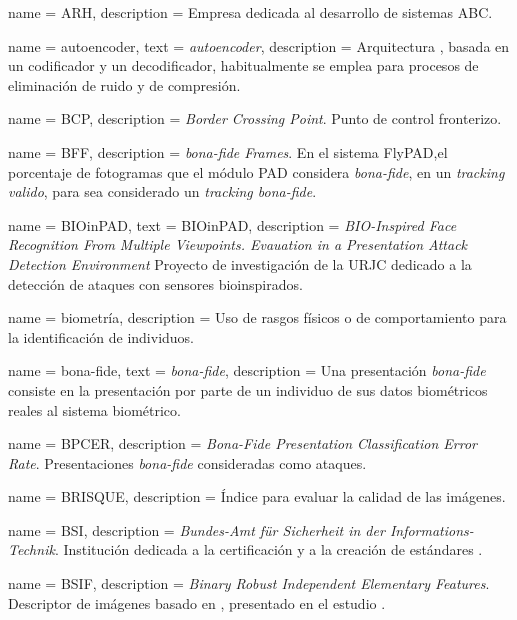 {
    name        = {ARH},
    description = {Empresa dedicada al desarrollo de sistemas ABC.}
}

{
    name        = {autoencoder},
    text        = {\textit{autoencoder}},
    description = {Arquitectura , basada en un codificador y un decodificador, habitualmente se emplea para procesos de eliminación de ruido y de compresión.}
}

{
    name        = {BCP},
    description = {\textit{Border Crossing Point}. Punto de control fronterizo.}
}

{
    name        = BFF,
    description = {\textit{\Gls{bona-fide} Frames}. En el sistema \gls{FlyPAD},el porcentaje de fotogramas que el módulo \gls{PAD} considera \textit{bona-fide}, en un \textit{tracking valido}, para sea considerado un \textit{tracking bona-fide}.}
}

{
    name        = BIOinPAD,
    text        = \mbox{BIOinPAD},
    description = {\textit{BIO-Inspired Face Recognition From Multiple Viewpoints. Evauation in a Presentation Attack Detection Environment} Proyecto de investigación de la URJC dedicado a la detección de ataques con sensores bioinspirados.}
}

{
    name        = biometría,
    description = {Uso de rasgos físicos o de comportamiento para la identificación de individuos.}
}

{
    name        = bona-fide,
    text        = {\mbox{\textit{bona-fide}}},
    description = {Una presentación \textit{bona-fide} consiste en la presentación por parte de un individuo de sus datos biométricos reales al sistema biométrico.}
}

{
    name        = BPCER,
    description = {\textit{Bona-Fide Presentation Classification Error Rate}. Presentaciones \textit{bona-fide} consideradas como ataques.}
}

{
    name        = BRISQUE,
    description = {Índice para evaluar la calidad de las imágenes.}
}

{
    name        = BSI,
    description = {\textit{Bundes-Amt für Sicherheit in der Informations-Technik}. Institución dedicada a la certificación y a la creación de estándares \cite{BSIOnline}.}
}

{
    name        = BSIF,
    description = {\textit{Binary Robust Independent Elementary Features}. Descriptor de imágenes basado en , presentado en el estudio \cite{kannala2012bsif}.}
}


